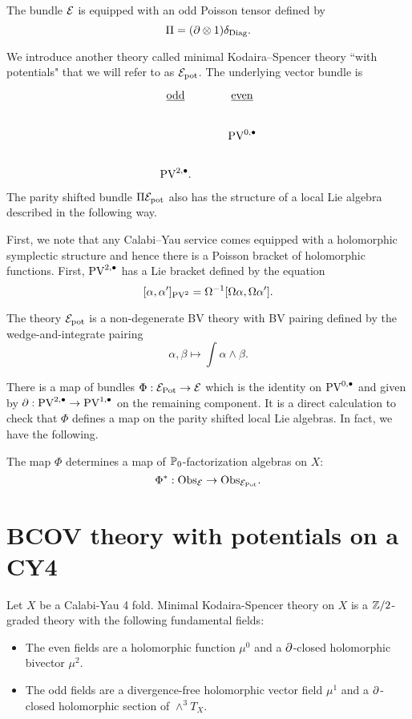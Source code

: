 \documentclass[11pt]{article}
\newcommand\bu{\bullet}
\begin{document}
The bundle $\mathcal{E}$ is equipped with an odd Poisson tensor defined by 
\[
\Pi = (\partial \otimes 1) \delta_{\rm Diag} .
\]

We introduce another theory called minimal Kodaira--Spencer theory ``with potentials" that we will refer to as $\mathcal{E}_{\rm pot}$. 
The underlying vector bundle is 
\[
\begin{tikzcd}
\ul{\rm odd} & \ul{\rm even} \\
 & \PV^{0,\bu} \\
 \PV^{2,\bu}  .
\end{tikzcd}
\]
The parity shifted bundle $\Pi \mathcal{E}_{\rm pot}$ also has the structure of a local Lie algebra described in the following way. 

First, we note that any Calabi--Yau service comes equipped with a holomorphic symplectic structure and hence there is a Poisson bracket of holomorphic functions. 
First, $\PV^{2, \bu}$ has a Lie bracket defined by the equation
\[
[\alpha, \alpha']_{\text{PV}^2} = \Omega^{-1} [\Omega \alpha, \Omega \alpha'] .
\]

The theory $\mathcal{E}_{\rm pot}$ is a non-degenerate BV theory with BV pairing defined by the wedge-and-integrate pairing
\[
\alpha, \beta \mapsto \int \alpha \wedge \beta  .
\]

There is a map of bundles $\Phi : \mathcal{E}_{\rm Pot} \to \mathcal{E}$ which is the identity on $\PV^{0,\bu}$ and given by $\partial : \PV^{2,\bu} \to \PV^{1,\bu}$ on the remaining component. 
It is a direct calculation to check that $\Phi$ defines a map on the parity shifted local Lie algebras.
In fact, we have the following.

\begin{prop}
The map $\Phi$ determines a map of $\mathbb{P}_0$-factorization algebras on $X$:
\[
\Phi^* : {\rm Obs}_{\mathcal{E}} \to {\rm Obs}_{\mathcal{E}_{\rm Pot}} .
\]
\end{prop}

\section{BCOV theory with potentials on a CY4}
\label{sec:org3d6a090}
Let \(X\) be a Calabi-Yau 4 fold. Minimal Kodaira-Spencer theory on $X$ is a $\mathbb{Z}/2$-graded theory with the following fundamental fields:
\begin{itemize}
\item The even fields are a holomorphic function $\mu^0$ and a $\partial$-closed holomorphic bivector $\mu^2$.
\item The odd fields are a divergence-free holomorphic vector field $\mu^1$ and a $\partial$-closed holomorphic section of $\wedge^3 T_X$. 
\end{itemize}
\end{document}
